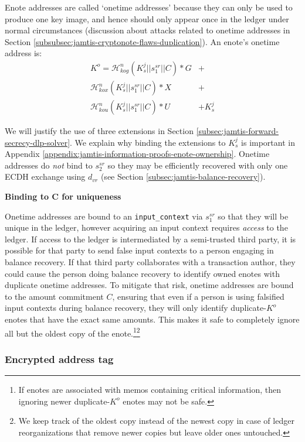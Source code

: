 Enote addresses are called `onetime addresses' because they can only be used to produce one key image, and hence should only appear once in the ledger under normal circumstances (discussion about attacks related to onetime addresses in Section \ref{subsubsec:jamtis-cryptonote-flaws-duplication}). An enote's onetime address is:\vspace{.115cm}
\begin{align*}
    K^o = \mathcal{H}^n_{kog}(K^j_s || s^{sr}_1 || C)*G &+ \\
    \mathcal{H}^n_{kox}(K^j_s || s^{sr}_1 || C)*X &+ \\
    \mathcal{H}^n_{kou}(K^j_s || s^{sr}_1 || C)*U &+ K^j_s
\end{align*}

We will justify the use of three extensions in Section \ref{subsec:jamtis-forward-secrecy-dlp-solver}. We explain why binding the extensions to $K^j_s$ is important in Appendix \ref{appendix:jamtis-information-proofs-enote-ownership}. Onetime addresses do {\em not} bind to $s^{sr}_2$ so they may be efficiently recovered with only one ECDH exchange using $d_{vr}$ (see Section \ref{subsec:jamtis-balance-recovery}).

\textbf{Binding to C for uniqueness}

Onetime addresses are bound to an {\tt input\_context} via $s^{sr}_1$ so that they will be unique in the ledger, however acquiring an input context requires {\em access} to the ledger. If access to the ledger is intermediated by a semi-trusted third party, it is possible for that party to send false input contexts to a person engaging in balance recovery. If that third party collaborates with a transaction author, they could cause the person doing balance recovery to identify owned enotes with duplicate onetime addresses. To mitigate that risk, onetime addresses are bound to the amount commitment $C$, ensuring that even if a person is using falsified input contexts during balance recovery, they will only identify duplicate-$K^o$ enotes that have the exact same amounts. This makes it safe to completely ignore all but the oldest copy of the enote.\footnote{If enotes are associated with memos containing critical information, then ignoring newer duplicate-$K^o$ enotes may not be safe.}\footnote{We keep track of the oldest copy instead of the newest copy in case of ledger reorganizations that remove newer copies but leave older ones untouched.}

\subsubsection{Encrypted address tag}
\label{subsubsec:jamtis-enote-construction-encrypted-addr-tag}

